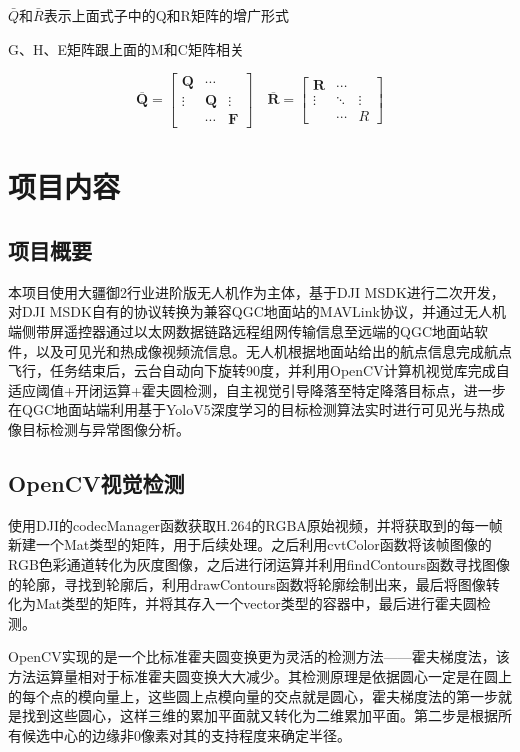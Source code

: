 $\bar{Q}$和$\bar{R}$表示上面式子中的Q和R矩阵的增广形式

G、H、E矩阵跟上面的M和C矩阵相关

$$
\overline{\boldsymbol{Q}}=\left[\begin{array}{ccc}\boldsymbol{Q} & \cdots & \\\vdots & \boldsymbol{Q} & \vdots \\& \cdots & \boldsymbol{F}\end{array}\right] \quad \overline{\boldsymbol{R}}=\left[\begin{array}{ccc}\boldsymbol{R} & \cdots & \\\vdots & \ddots & \vdots \\& \cdots & R\end{array}\right]
$$

\chapter{项目内容}

\section{项目概要}

本项目使用大疆御2行业进阶版无人机作为主体，基于DJI MSDK进行二次开发，对DJI MSDK自有的协议转换为兼容QGC地面站的MAVLink协议，并通过无人机端侧带屏遥控器通过以太网数据链路远程组网传输信息至远端的QGC地面站软件，以及可见光和热成像视频流信息。无人机根据地面站给出的航点信息完成航点飞行，任务结束后，云台自动向下旋转90度，并利用OpenCV计算机视觉库完成自适应阈值+开闭运算+霍夫圆检测，自主视觉引导降落至特定降落目标点，进一步在QGC地面站端利用基于YoloV5深度学习的目标检测算法实时进行可见光与热成像目标检测与异常图像分析。

\section{OpenCV视觉检测}

使用DJI的codecManager函数获取H.264的RGBA原始视频，并将获取到的每一帧新建一个Mat类型的矩阵，用于后续处理。之后利用cvtColor函数将该帧图像的RGB色彩通道转化为灰度图像，之后进行闭运算并利用findContours函数寻找图像的轮廓，寻找到轮廓后，利用drawContours函数将轮廓绘制出来，最后将图像转化为Mat类型的矩阵，并将其存入一个vector类型的容器中，最后进行霍夫圆检测。

OpenCV实现的是⼀个比标准霍夫圆变换更为灵活的检测方法——霍夫梯度法，该方法运算量相对于标准霍夫圆变换大大减少。其检测原理是依据圆心一定是在圆上的每个点的模向量上，这些圆上点模向量的交点就是圆⼼，霍夫梯度法的第一步就是找到这些圆心，这样三维的累加平⾯就又转化为二维累加平⾯。第二步是根据所有候选中心的边缘非0像素对其的支持程度来确定半径。


